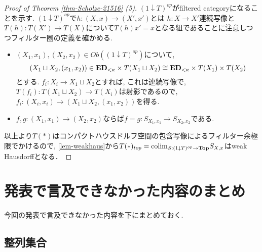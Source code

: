 \documentclass[dvipdfmx,a4paper,11pt]{article}
\newcommand{\colim}{{\rm colim}}
\theoremstyle{definition}
\begin{document}
\begin{proof}[Proof of Theorem \ref{thm-Scholze-21516} (5)]
 $ ( 1\downarrow T)^{op}$がfiltered categoryになることを示す. 
  $ ( 1\downarrow T)^{op}$で$h : (X,x) \to (X',x') $とは $h : X \to X'$連続写像と$T(h): T(X') \to T(X)$について$T(h)x' =x$となる組であることに注意しつつフィルター圏の定義を確かめる. 
 \begin{itemize}
\item $(X_1, x_1), (X_2,x_2) \in Ob(( 1\downarrow T)^{op})$について, 
$$(X_1 \sqcup X_2 , (x_1,x_2)) \in {\bf ED}_{<\kappa} \times T(X_1 \sqcup X_2) \cong {\bf ED}_{<\kappa} \times T(X_1) \times T(X_2)$$
とする.  
$f_i : X_i \to X_1 \sqcup X_2$とすれば, これは連続写像で, $T(f_i) : T(X_1 \sqcup X_2) \to T(X_i)$は射影であるので, $f_i : (X_i,x_i) \to (X_1 \sqcup X_2 , (x_1,x_2)) $を得る. 
\item $f, g : (X_1, x_1) \to (X_2,x_2) $ならば$f=g : S_{X_1, x_1} \to S_{X_2, x_2}$である.
\end{itemize}

以上より$T(\ast)$はコンパクトハウスドルフ空間の包含写像によるフィルター余極限でかけるので, \ref{lem-weakhaus}から$T(\ast)_{top} = \colim_{S : ( 1\downarrow T)^{op} \to {\bf Top}}S_{X,x}$はweak Hausdorffとなる．

\end{proof}





\newpage


\renewcommand{\thesection}{\Alph{section}} \setcounter{section}{0}
\section{発表で言及できなかった内容のまとめ}
今回の発表で言及できなかった内容を下にまとめておく.


\subsection{整列集合}
\end{document}
